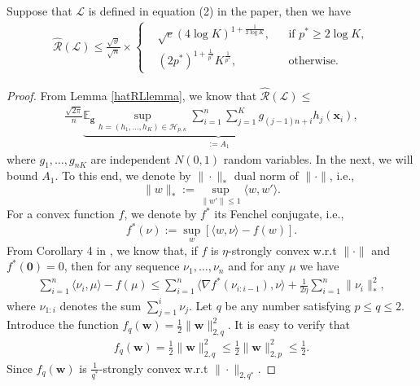 \documentclass[10pt]{llncs}
\begin{document}
\begin{theorem}
  \label{Lemma-empRad}
Suppose that $\mathcal{L}$ is defined in equation \textrm{(2)} in the paper,
then we have
  \begin{align*}
    \hat{\mathcal{R}}(\mathcal{L})\leq \frac{\sqrt{\vartheta}}{\sqrt{n}}\times
      \left\{
      \begin{aligned}
      &\sqrt{e}(4\log K)^{1+\frac{1}{2\log K}}, &&\text{if } p^\ast\geq 2\log K,\\
      &(2p^\ast)^{1+\frac{1}{p^\ast}}K^{\frac{1}{p^\ast}}, &&\text{otherwise.}
      \end{aligned}
      \right.
  \end{align*}
\end{theorem}
\begin{proof}
From Lemma \ref{hatRLlemma}, we know that
$\hat{\mathcal{R}}(\mathcal{L})\leq $
\begin{align}
\label{eq-middle-mi}
  \frac{\sqrt{2\pi}}{n}\underbrace{\mathbb{E}_{\mathbf g}\sup_{h=(h_1,\ldots,h_K)
  \in\mathcal{H}_{p,\kappa}}\sum_{i=1}^n\sum_{j=1}^Kg_{(j-1)n+i}h_j(\mathbf x_i)}_{:=A_1},
\end{align}
  where $g_1,\ldots,g_{nK}$ are  independent $N(0,1)$ random variables.
  In the next, we will bound $A_1$.
  To this end,
 we denote by $\|\cdot\|_\ast$ dual norm of $\|\cdot\|$, i.e.,
$$\|w\|_\ast:=\sup_{\| w'\|\leq 1}\langle w, w'\rangle.$$
For a convex function $f$, we denote by $f^\ast$ its Fenchel
conjugate, i.e., $$f^\ast(\nu):=\sup_{w}\left[\langle w,\nu\rangle-f(w)\right].$$
  From Corollary 4 in \cite{Theodoros2000regularization}, we know that,
  if $f$ is $\eta$-strongly convex w.r.t $\|\cdot\|$ and $f^\ast(\mathbf 0)=0$, then for any sequence
  $\nu_1,\ldots,\nu_n$ and for any $\mu$ we have
  \begin{align*}
    \sum_{i=1}^n\langle \nu_i,\mu\rangle -f(\mu) \leq
    \sum_{i=1}^n\langle \nabla f^\ast(\nu_{i:i-1}),\nu\rangle +\frac{1}{2\eta}\sum_{i=1}^n\|\nu_i\|_\ast^2,
  \end{align*}
  where $\nu_{1:i}$ denotes the sum $\sum_{j=1}^i\nu_j$.
  Let $q$ be any number satisfying $p\leq q\leq 2$.
  Introduce the function $f_q(\mathbf w)=\frac{1}{2}\|\mathbf w\|_{2,q}^2$.
  It is easy to verify that
  \begin{align*}
    f_q(\mathbf w)=\frac{1}{2}\|\mathbf w\|_{2,q}^2\leq\frac{1}{2}\|\mathbf w\|_{2,p}^2\leq  \frac{1}{2}.
  \end{align*}
  Since  $f_q(\mathbf w)$ is $\frac{1}{q^\ast}$-strongly convex w.r.t  $\|\cdot\|_{2,q^\ast}$.

\end{proof}
\end{document}

